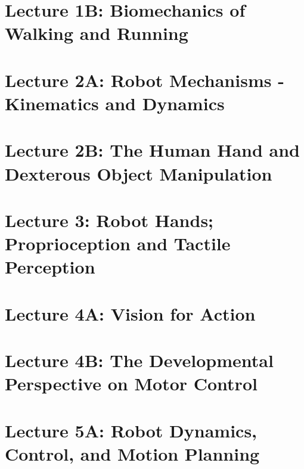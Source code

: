 \documentclass[a4paper]{article}
\begin{document}
\section{Lecture 1B: Biomechanics of Walking and Running}


\section{Lecture 2A: Robot Mechanisms - Kinematics and Dynamics}


\section{Lecture 2B: The Human Hand and Dexterous Object Manipulation}


\section{Lecture 3: Robot Hands; Proprioception and Tactile Perception}


\section{Lecture 4A: Vision for Action}


\section{Lecture 4B: The Developmental Perspective on Motor Control}


\section{Lecture 5A: Robot Dynamics, Control, and Motion Planning}

\end{document}
